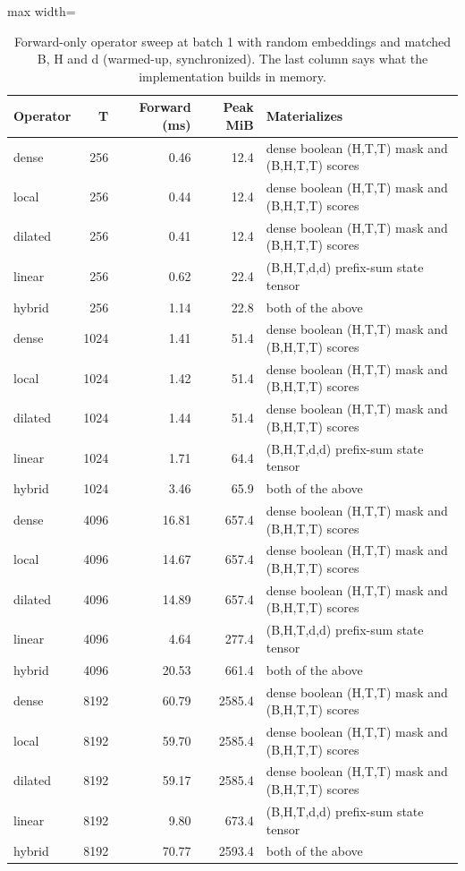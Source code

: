 \begin{table}[!htb]
\centering
\scriptsize
\setlength{\tabcolsep}{3.5pt}
\caption{Forward-only operator sweep at batch 1 with random embeddings and matched B, H and d (warmed-up, synchronized). The last column says what the implementation builds in memory.}
\label{tab:t2bsweep}
\begin{adjustbox}{max width=\linewidth}
\begin{tabular}{lrrrp{6.2cm}}
\toprule
Operator & T & Forward (ms) & Peak MiB & Materializes \\
\midrule
dense & 256 & 0.46 & 12.4 & dense boolean (H,T,T) mask and (B,H,T,T) scores \\
local & 256 & 0.44 & 12.4 & dense boolean (H,T,T) mask and (B,H,T,T) scores \\
dilated & 256 & 0.41 & 12.4 & dense boolean (H,T,T) mask and (B,H,T,T) scores \\
linear & 256 & 0.62 & 22.4 & (B,H,T,d,d) prefix-sum state tensor \\
hybrid & 256 & 1.14 & 22.8 & both of the above \\
dense & 1024 & 1.41 & 51.4 & dense boolean (H,T,T) mask and (B,H,T,T) scores \\
local & 1024 & 1.42 & 51.4 & dense boolean (H,T,T) mask and (B,H,T,T) scores \\
dilated & 1024 & 1.44 & 51.4 & dense boolean (H,T,T) mask and (B,H,T,T) scores \\
linear & 1024 & 1.71 & 64.4 & (B,H,T,d,d) prefix-sum state tensor \\
hybrid & 1024 & 3.46 & 65.9 & both of the above \\
dense & 4096 & 16.81 & 657.4 & dense boolean (H,T,T) mask and (B,H,T,T) scores \\
local & 4096 & 14.67 & 657.4 & dense boolean (H,T,T) mask and (B,H,T,T) scores \\
dilated & 4096 & 14.89 & 657.4 & dense boolean (H,T,T) mask and (B,H,T,T) scores \\
linear & 4096 & 4.64 & 277.4 & (B,H,T,d,d) prefix-sum state tensor \\
hybrid & 4096 & 20.53 & 661.4 & both of the above \\
dense & 8192 & 60.79 & 2585.4 & dense boolean (H,T,T) mask and (B,H,T,T) scores \\
local & 8192 & 59.70 & 2585.4 & dense boolean (H,T,T) mask and (B,H,T,T) scores \\
dilated & 8192 & 59.17 & 2585.4 & dense boolean (H,T,T) mask and (B,H,T,T) scores \\
linear & 8192 & 9.80 & 673.4 & (B,H,T,d,d) prefix-sum state tensor \\
hybrid & 8192 & 70.77 & 2593.4 & both of the above \\
\bottomrule
\end{tabular}
\end{adjustbox}
\end{table}
